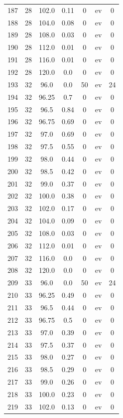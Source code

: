 \documentclass[12pt,a4paper]{article}
\begin{document}
\begin{tabular}{r|cccccc}
	187 & 28 & 102.0 & 0.11 & 0 & ev & 0 \\
	188 & 28 & 104.0 & 0.08 & 0 & ev & 0 \\
	189 & 28 & 108.0 & 0.03 & 0 & ev & 0 \\
	190 & 28 & 112.0 & 0.01 & 0 & ev & 0 \\
	191 & 28 & 116.0 & 0.01 & 0 & ev & 0 \\
	192 & 28 & 120.0 & 0.0 & 0 & ev & 0 \\
	193 & 32 & 96.0 & 0.0 & 50 & ev & 24 \\
	194 & 32 & 96.25 & 0.7 & 0 & ev & 0 \\
	195 & 32 & 96.5 & 0.84 & 0 & ev & 0 \\
	196 & 32 & 96.75 & 0.69 & 0 & ev & 0 \\
	197 & 32 & 97.0 & 0.69 & 0 & ev & 0 \\
	198 & 32 & 97.5 & 0.55 & 0 & ev & 0 \\
	199 & 32 & 98.0 & 0.44 & 0 & ev & 0 \\
	200 & 32 & 98.5 & 0.42 & 0 & ev & 0 \\
	201 & 32 & 99.0 & 0.37 & 0 & ev & 0 \\
	202 & 32 & 100.0 & 0.38 & 0 & ev & 0 \\
	203 & 32 & 102.0 & 0.17 & 0 & ev & 0 \\
	204 & 32 & 104.0 & 0.09 & 0 & ev & 0 \\
	205 & 32 & 108.0 & 0.03 & 0 & ev & 0 \\
	206 & 32 & 112.0 & 0.01 & 0 & ev & 0 \\
	207 & 32 & 116.0 & 0.0 & 0 & ev & 0 \\
	208 & 32 & 120.0 & 0.0 & 0 & ev & 0 \\
	209 & 33 & 96.0 & 0.0 & 50 & ev & 24 \\
	210 & 33 & 96.25 & 0.49 & 0 & ev & 0 \\
	211 & 33 & 96.5 & 0.44 & 0 & ev & 0 \\
	212 & 33 & 96.75 & 0.5 & 0 & ev & 0 \\
	213 & 33 & 97.0 & 0.39 & 0 & ev & 0 \\
	214 & 33 & 97.5 & 0.37 & 0 & ev & 0 \\
	215 & 33 & 98.0 & 0.27 & 0 & ev & 0 \\
	216 & 33 & 98.5 & 0.29 & 0 & ev & 0 \\
	217 & 33 & 99.0 & 0.26 & 0 & ev & 0 \\
	218 & 33 & 100.0 & 0.23 & 0 & ev & 0 \\
	219 & 33 & 102.0 & 0.13 & 0 & ev & 0 \\

\end{tabular}
\end{document}
